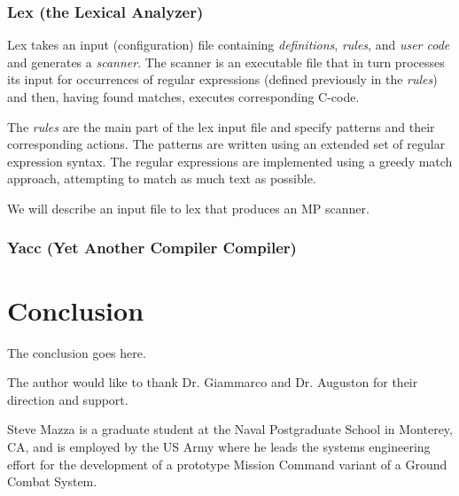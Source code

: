 \documentclass[journal]{IEEEtran}
\begin{document}
\subsubsection{Lex (the Lexical Analyzer)}
Lex takes an input (configuration) file containing 
\emph{definitions}, \emph{rules}, and \emph{user code} and generates
a \emph{scanner}.  The scanner is an executable file that in turn 
processes its input for occurrences of regular expressions (defined
previously in the \emph{rules}) and then, 
having found matches, executes corresponding C-code.

The \emph{rules} are the main part of the lex input file and specify patterns
and their corresponding actions.  The patterns are written using an extended set 
of regular expression syntax.  The regular expressions are implemented using a 
greedy match approach, attempting to match as much text as possible.

We will describe an input file to lex that produces an MP scanner.

\subsubsection{Yacc (Yet Another Compiler Compiler)}


\section{Conclusion}
The conclusion goes here.


\appendix[Acknowledgment]
The author would like to thank Dr. Giammarco and Dr. Auguston 
for their direction and support.


%


% 

\begin{IEEEbiographynophoto}{Steve Mazza}
is a graduate student at the Naval Postgraduate School in Monterey, CA, and
is employed by the US Army where he leads the systems engineering effort for the 
development of a prototype Mission Command variant of a Ground Combat System.
\end{IEEEbiographynophoto}
\end{document}
